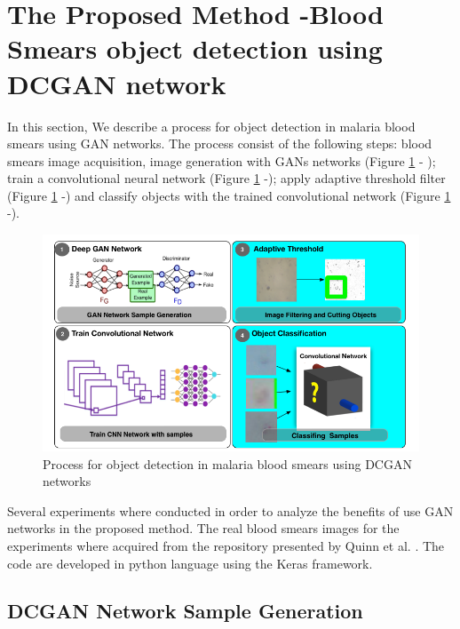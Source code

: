 \section{The Proposed Method -Blood Smears object detection using DCGAN network}
\label{segmethod}

In this section, We describe a process for object detection in malaria blood smears using GAN networks. The process consist of the following  steps: blood smears image acquisition, image generation with GANs networks (Figure \ref{fig:maincomp} - ); train a convolutional neural network (Figure \ref{fig:maincomp} -);  apply adaptive  threshold filter (Figure \ref{fig:maincomp} -) and classify objects with the trained convolutional network (Figure \ref{fig:maincomp} -). 

\begin{figure}[h]
\caption{Process for object detection in malaria blood smears using DCGAN networks}
\label{fig:maincomp}
  \includegraphics[width=\textwidth]{images/MainComponents.png}
\end{figure}

Several experiments where conducted in order to analyze the benefits of use GAN networks in the proposed method. The real blood smears images for the experiments where acquired from the repository presented by Quinn et al. \cite{Quinn2016DeepDiagnostics}.  The code are developed in python language using the Keras framework.

\subsection{DCGAN Network Sample Generation}

